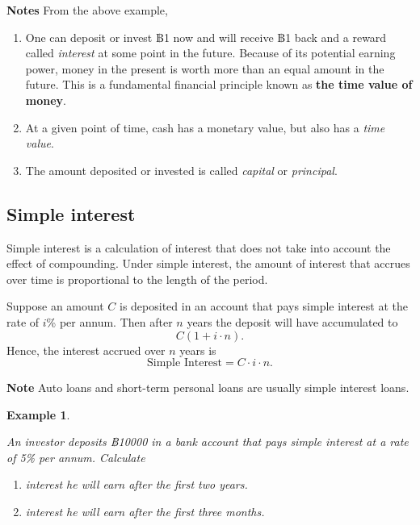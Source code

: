 \documentclass[landscape, 20pt]{extreport}
\theoremstyle{definition}
\theoremstyle{definition}
\newtheorem{example}{Example}[chapter]
\theoremstyle{definition}
\theoremstyle{definition}
\theoremstyle{remark}
\begin{document}
\textbf{Notes} From the above example,

\begin{enumerate}
\def\labelenumi{\arabic{enumi}.}
\item
  One can deposit or invest ฿1 now and will receive ฿1 back and a
  reward called \emph{interest} at some point in the future. Because of its
  potential earning power, money in the present is worth more than an
  equal amount in the future. This is a fundamental financial
  principle known as \textbf{the time value of money}.
\item
  At a given point of time, cash has a monetary value, but also has a
  \emph{time value}.
\item
  The amount deposited or invested is called \emph{capital} or \emph{principal}.
\end{enumerate}

\hypertarget{simple-interest}{%
\newpage \subsection{Simple interest}\label{simple-interest}}

Simple interest is a calculation of interest that does not take into
account the effect of compounding. Under simple interest, the amount of interest that accrues over time is proportional to the length of the period.

Suppose an amount \(C\) is deposited in
an account that pays simple interest at the rate of \(i\)\% per annum. Then
after \(n\) years the deposit will have accumulated to
\[C( 1 + i \cdot n).\] Hence, the interest accrued over \(n\) years is
\[\text{Simple Interest}  = C \cdot i \cdot n.\]

\textbf{Note} Auto loans and short-term personal loans are usually simple
interest loans.

\newpage \begin{example}
\protect\hypertarget{exm:unlabeled-div-3}{}\label{exm:unlabeled-div-3}

\emph{An investor deposits ฿10000 in a bank account that pays simple interest
at a rate of 5\% per annum. Calculate}

\begin{enumerate}
\def\labelenumi{\arabic{enumi}.}
\item
  \emph{interest he will earn after the first two years.}
\item
  \emph{interest he will earn after the first three months.}
\end{enumerate}

\end{example}
\end{document}
